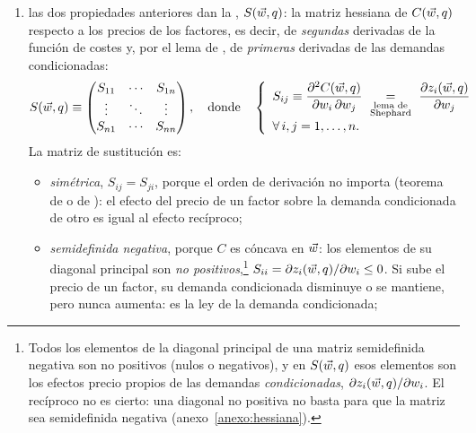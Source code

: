 \documentclass[11pt]{article}
\begin{document}
\begin{itemize}
\begin{enumerate}
    Las demandas condicionadas se obtienen derivando la función de costes. Intuición: si $w_i$ sube un euro, la combinación óptima apenas cambia en primer orden (teorema de la envolvente) y el coste sube $z_i$ euros. La demostración está en el anexo~\ref{anexo:envolvente};
  \item las dos propiedades anteriores dan la , $S(\vec{w},q)$: la matriz hessiana de $C(\vec{w},q)$ respecto a los precios de los factores, es decir, de \emph{segundas} derivadas de la función de costes y, por el lema de , de \emph{primeras} derivadas de las demandas condicionadas:
    \begin{equation}
    S(\vect{w},q)\equiv\begin{pmatrix} S_{11} & \cdots & S_{1n}\\ \vdots & \ddots & \vdots\\ S_{n1} & \cdots & S_{nn}\end{pmatrix},\quad\text{donde}\quad
    \left\{\begin{array}{l}
    S_{ij}\equiv\dfrac{\partial^2C(\vect{w},q)}{\partial w_i\,\partial w_j}\ \underset{\substack{\text{lema de}\\ \text{Shephard}}}{=}\ \dfrac{\partial z_i(\vect{w},q)}{\partial w_j}\\[12pt]
    \forall\, i,j=1,\dots,n.
    \end{array}\right. \label{eq:matriz-sustitucion}
    \end{equation}
    La matriz de sustitución es:
    \begin{itemize}
    \item \emph{simétrica}, $S_{ij}=S_{ji}$, porque el orden de derivación no importa (teorema de  o de ): el efecto del precio de un factor sobre la demanda condicionada de otro es igual al efecto recíproco;
    \item \emph{semidefinida negativa}, porque $C$ es cóncava en $\vec{w}$: los elementos de su diagonal principal son \emph{no positivos},\footnote{Todos los elementos de la diagonal principal de una matriz semidefinida negativa son no positivos (nulos o negativos), y en $S(\vec{w},q)$ esos elementos son los efectos precio propios de las demandas \emph{condicionadas}, $\partial z_i(\vec{w},q)/\partial w_i$. El recíproco no es cierto: una diagonal no positiva no basta para que la matriz sea semidefinida negativa (anexo~\ref{anexo:hessiana}).} $S_{ii}=\partial z_i(\vec{w},q)/\partial w_i\leq 0$. Si sube el precio de un factor, su demanda condicionada disminuye o se mantiene, pero nunca aumenta: es la ley de la demanda condicionada;

\end{itemize}
\end{enumerate}
\end{itemize}
\end{document}
